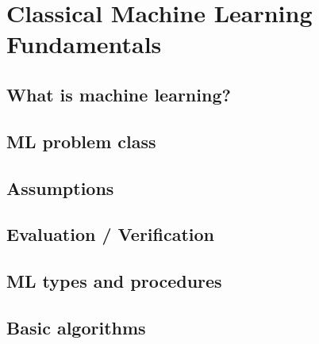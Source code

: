 \chapter{Classical Machine Learning Fundamentals}
\section{What is machine learning?}
\section{ML problem class}
\section{Assumptions}
\section{Evaluation / Verification}
\section{ML types and procedures}
\section{Basic algorithms}